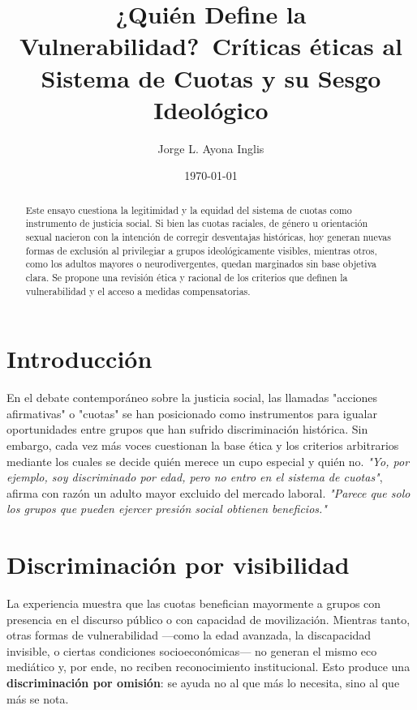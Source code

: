 \documentclass[12pt]{article}
\title{\textbf{\large\centering}\textbf{\Large ¿Quién Define la Vulnerabilidad?}\ Críticas éticas al Sistema de Cuotas y su Sesgo Ideológico}
\author{Jorge L. Ayona Inglis}
\date{\today}
\begin{document}
\maketitle
\onehalfspacing

\begin{abstract}
Este ensayo cuestiona la legitimidad y la equidad del sistema de cuotas como instrumento de justicia social. Si bien las cuotas raciales, de género u orientación sexual nacieron con la intención de corregir desventajas históricas, hoy generan nuevas formas de exclusión al privilegiar a grupos ideológicamente visibles, mientras otros, como los adultos mayores o neurodivergentes, quedan marginados sin base objetiva clara. Se propone una revisión ética y racional de los criterios que definen la vulnerabilidad y el acceso a medidas compensatorias.
\end{abstract}

\section*{Introducción}
En el debate contemporáneo sobre la justicia social, las llamadas "acciones afirmativas" o "cuotas" se han posicionado como instrumentos para igualar oportunidades entre grupos que han sufrido discriminación histórica. Sin embargo, cada vez más voces cuestionan la base ética y los criterios arbitrarios mediante los cuales se decide quién merece un cupo especial y quién no. \textit{"Yo, por ejemplo, soy discriminado por edad, pero no entro en el sistema de cuotas"}, afirma con razón un adulto mayor excluido del mercado laboral. \textit{"Parece que solo los grupos que pueden ejercer presión social obtienen beneficios."}

\section*{Discriminación por visibilidad}
La experiencia muestra que las cuotas benefician mayormente a grupos con presencia en el discurso público o con capacidad de movilización. Mientras tanto, otras formas de vulnerabilidad —como la edad avanzada, la discapacidad invisible, o ciertas condiciones socioeconómicas— no generan el mismo eco mediático y, por ende, no reciben reconocimiento institucional. Esto produce una \textbf{discriminación por omisión}: se ayuda no al que más lo necesita, sino al que más se nota.
\end{document}
